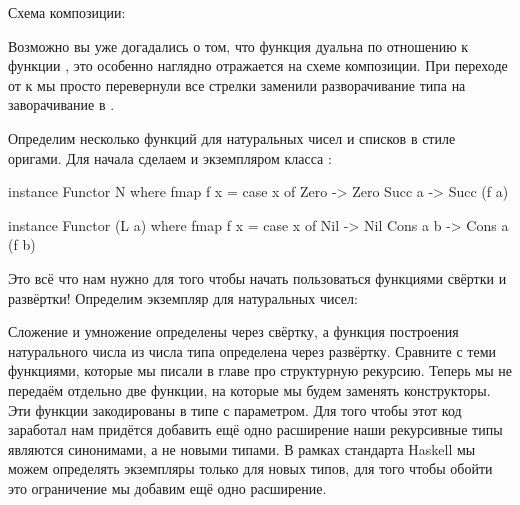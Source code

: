Схема композиции:

\begin{centering}



\end{centering}

Возможно вы уже догадались о том, что функция  дуальна по
отношению к функции , это особенно наглядно отражается на
схеме композиции. При переходе от  к  мы просто
перевернули все стрелки заменили разворачивание типа  на
заворачивание в .

Определим несколько функций для натуральных чисел и списков в стиле
оригами. Для начала сделаем  и  экземпляром класса
:


\begin{code}
instance Functor N where
    fmap f x = case x of
        Zero    -> Zero
        Succ a  -> Succ (f a)

instance Functor (L a) where
    fmap f x = case x of
        Nil         -> Nil
        Cons a b    -> Cons a (f b)
\end{code}

Это всё что нам нужно для того чтобы начать пользоваться функциями
свёртки и развёртки! Определим экземпляр  для натуральных чисел:



Сложение и умножение определены через свёртку, а функция построения
натурального числа из числа типа  определена через
развёртку. Сравните с теми функциями, которые мы писали в главе про
структурную рекурсию. Теперь мы не передаём отдельно две функции, на
которые мы будем заменять конструкторы. Эти функции закодированы в типе
с параметром. Для того чтобы этот код заработал нам придётся добавить
ещё одно расширение  наши рекурсивные типы
являются синонимами, а не новыми типами. В рамках стандарта Haskell мы
можем определять экземпляры только для новых типов, для того чтобы
обойти это ограничение мы добавим ещё одно расширение.


